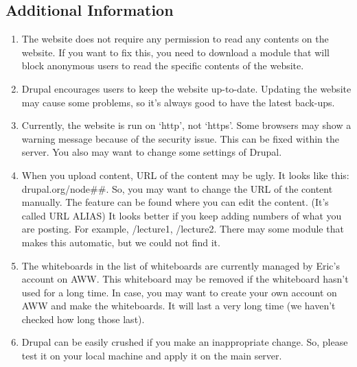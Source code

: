 \documentclass[10pt]{article}
\begin{document}
    \subsection{Additional Information}    
        \begin{enumerate}  
            \item The website does not require any permission to read any contents on the website. If you want to fix this, you need to download a module that will block anonymous users to read the specific contents of the website.
            \item Drupal encourages users to keep the website up-to-date. Updating the website may cause some problems, so it’s always good to have the latest back-ups.
            \item Currently, the website is run on `http’, not `https’. Some browsers may show a warning message because of the security issue. This can be fixed within the server. You also may want to change some settings of Drupal.
            
            \item When you upload content, URL of the content may be ugly. It looks like this: drupal.org/node\#\#. So, you may want to change the URL of the content manually. The feature can be found where you can edit the content. (It’s called URL ALIAS) It looks better if you keep adding numbers of what you are posting. For example, /lecture1, /lecture2. There may some module that makes this automatic, but we could not find it.
            
            \item The whiteboards in the list of whiteboards are currently managed by Eric’s account on AWW. This whiteboard may be removed if the whiteboard hasn’t used for a long time. In case, you may want to create your own account on AWW and make the whiteboards. It will last a very long time (we haven’t checked how long those last).
            \item Drupal can be easily crushed if you make an inappropriate change. So, please test it on your local machine and apply it on the main server.
        \end{enumerate}
\clearpage 
\end{document}
